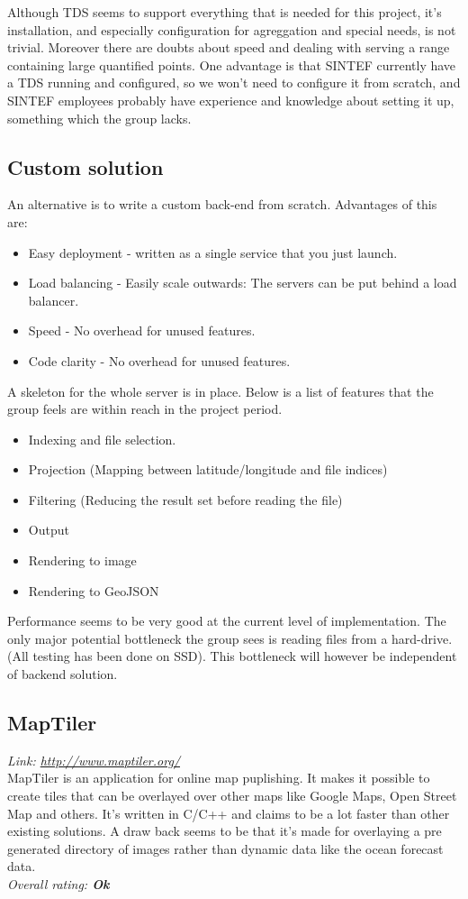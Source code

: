 \documentclass[11pt,a4paper,titlepage,oneside]{report}
\begin{document}
  Although \gls{TDS} seems to support everything that is needed for this project, it's installation, and especially configuration for agreggation and special needs, is not trivial. Moreover there are doubts about speed and dealing with serving a range containing large quantified points. One advantage is that SINTEF currently have a \gls{TDS} running and configured, so we won't need to configure it from scratch, and SINTEF employees probably have experience and knowledge about setting it up, something which the group lacks.

  \subsection{Custom solution}
  An alternative is to write a custom back-end from scratch.
  Advantages of this are:
  \begin{itemize}
  \item Easy deployment - written as a single service that you just launch.
  \item Load balancing - Easily scale outwards: The servers can be put behind a load balancer. 
  \item Speed - No overhead for unused features.
  \item Code clarity - No overhead for unused features.
  \end{itemize}
  A skeleton for the whole server is in place. Below is a list of features that the group feels are within reach in the project period. 
  \begin{itemize}
  \item Indexing and file selection.
  \item Projection (Mapping between latitude/longitude and file indices)
  \item Filtering (Reducing the result set before reading the file)
  \item Output
  \item Rendering to image
  \item Rendering to GeoJSON
  \end{itemize}

  Performance seems to be very good at the current level of implementation. The only major potential bottleneck the group sees is reading files from a hard-drive. (All testing has been done on \gls{SSD}). This bottleneck will however be independent of backend solution.
  
  \subsection{MapTiler}
  \emph{Link: \url{http://www.maptiler.org/}} \\%
    MapTiler is an application for online map puplishing. It makes it possible to create tiles that can be overlayed over other maps like Google Maps, Open Street Map and others. It's written in C/C++ and claims to be a lot faster than other existing solutions. A draw back seems to be that it's made for overlaying a pre generated directory of images rather than dynamic data like the ocean forecast data.
  \\ \emph{Overall rating: \textbf{Ok}}
  
\end{document}
